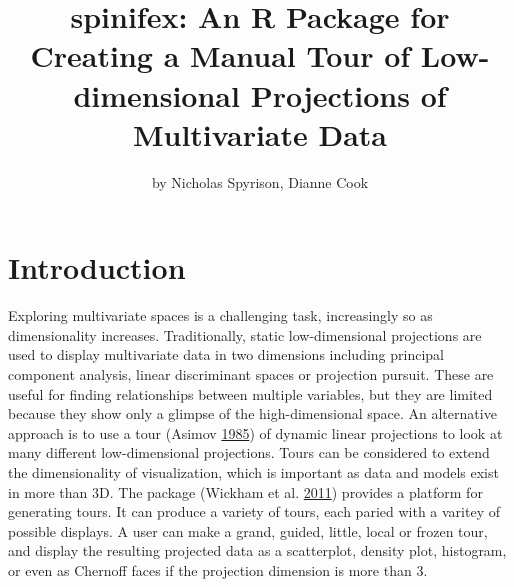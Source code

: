 \title{spinifex: An R Package for Creating a Manual Tour of Low-dimensional
Projections of Multivariate Data}
\author{by Nicholas Spyrison, Dianne Cook}

\maketitle





\hypertarget{introduction}{%
\section{Introduction}\label{introduction}}

Exploring multivariate spaces is a challenging task, increasingly so as
dimensionality increases. Traditionally, static low-dimensional
projections are used to display multivariate data in two dimensions
including principal component analysis, linear discriminant spaces or
projection pursuit. These are useful for finding relationships between
multiple variables, but they are limited because they show only a
glimpse of the high-dimensional space. An alternative approach is to use
a tour (Asimov \protect\hyperlink{ref-asimov_grand_1985}{1985}) of
dynamic linear projections to look at many different low-dimensional
projections. Tours can be considered to extend the dimensionality of
visualization, which is important as data and models exist in more than
3D. The package  (Wickham et al.
\protect\hyperlink{ref-wickham_tourr_2011}{2011}) provides a platform
for generating tours. It can produce a variety of tours, each paried
with a varitey of possible displays. A user can make a grand, guided,
little, local or frozen tour, and display the resulting projected data
as a scatterplot, density plot, histogram, or even as Chernoff faces if
the projection dimension is more than 3.

